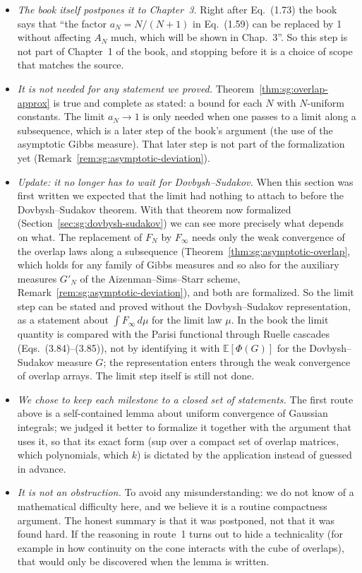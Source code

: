 \begin{itemize}
\item \emph{The book itself postpones it to Chapter~3.} Right after Eq.~(1.73) the book says that ``the factor $a_N=N/(N+1)$ in Eq.~(1.59) can be replaced by 1 without affecting $A_N$ much, which will be shown in Chap.~3''. So this step is not part of Chapter~1 of the book, and stopping before it is a choice of scope that matches the source.
\item \emph{It is not needed for any statement we proved.} Theorem~\ref{thm:sg:overlap-approx} is true and complete as stated: a bound for each $N$ with $N$-uniform constants. The limit $a_N\to1$ is only needed when one passes to a limit along a subsequence, which is a later step of the book's argument
(the use of the asymptotic Gibbs measure). That later step is not part of the formalization yet (Remark~\ref{rem:sg:asymptotic-deviation}).
\item \emph{Update: it no longer has to wait for Dovbysh--Sudakov.} When this section was first written we expected that the limit had nothing to attach to before the Dovbysh--Sudakov theorem. With that theorem now formalized (Section~\ref{sec:sg:dovbysh-sudakov}) we can see more precisely what depends on what.
The replacement of $F_N$ by $F_\infty$ needs only the weak convergence of the overlap laws along a subsequence (Theorem~\ref{thm:sg:asymptotic-overlap}, which holds for any family of Gibbs measures and so also for the auxiliary measures $G'_N$ of the Aizenman--Sims--Starr scheme, Remark~\ref{rem:sg:asymptotic-deviation}), and both are formalized. So the limit step can be stated and proved without the Dovbysh--Sudakov representation, as a statement about $\int F_\infty\,d\mu$ for the limit law $\mu$.
In the book the limit quantity is compared with the Parisi functional through Ruelle cascades (Eqs.~(3.84)--(3.85)), not by identifying it with $\mathbb E[\Phi(G)]$ for the Dovbysh--Sudakov measure $G$; the representation enters through the weak convergence of overlap arrays. The limit step itself is still not done.
\item \emph{We chose to keep each milestone to a closed set of statements.} The first route above is a self-contained lemma about uniform convergence of Gaussian integrals; we judged it better to formalize it together with the argument that uses it, so that its exact form
(sup over a compact set of overlap matrices, which polynomials, which $k$) is dictated by the application instead of guessed in advance.
\item \emph{It is not an obstruction.} To avoid any misunderstanding: we do not know of a mathematical difficulty here, and we believe it is a routine compactness argument. The honest summary is that it was postponed, not that it was found hard. If the reasoning in route~1 turns out to hide a technicality
(for example in how continuity on the cone interacts with the cube of overlaps), that would only be discovered when the lemma is written.
\end{itemize}

